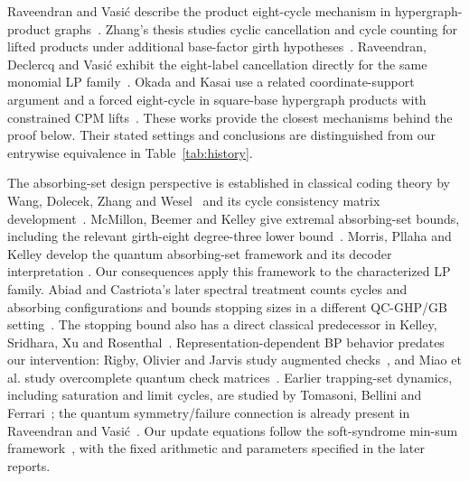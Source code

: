 \documentclass[11pt]{article}
\theoremstyle{definition}
\theoremstyle{remark}
\begin{document}
Raveendran and Vasi\'c describe the product eight-cycle mechanism in
hypergraph-product graphs~\cite{RV2021}. Zhang's thesis studies cyclic
cancellation and cycle counting for lifted products under additional
base-factor girth hypotheses~\cite{Zhang2024}. Raveendran, Declercq and
Vasi\'c exhibit the eight-label cancellation directly for the same monomial
LP family~\cite{RDV2025}. Okada and Kasai use a related coordinate-support
argument and a forced eight-cycle in square-base hypergraph products with
constrained CPM lifts~\cite{OK2026}. These works provide the closest
mechanisms behind the proof below. Their stated settings and conclusions
are distinguished from our entrywise equivalence in Table~\ref{tab:history}.

The absorbing-set design perspective is established in classical coding
theory by Wang, Dolecek, Zhang and Wesel~\cite{WDZW2011} and its cycle
consistency matrix development~\cite{WDW2012}. McMillon, Beemer and Kelley
give extremal absorbing-set bounds, including the relevant girth-eight
degree-three lower bound~\cite{MBK2023}. Morris, Pllaha and Kelley develop
the quantum absorbing-set framework and its decoder interpretation
\cite{MPK2026}. Our consequences apply this framework to the characterized
LP family. Abiad and Castriota's later spectral treatment counts cycles and
absorbing configurations and bounds stopping sizes in a different
QC-GHP/GB setting~\cite{AC2026}.
The stopping bound also has a direct classical predecessor in Kelley,
Sridhara, Xu and Rosenthal~\cite{KSXR2004}. Representation-dependent BP
behavior predates our intervention: Rigby, Olivier and Jarvis study
augmented checks~\cite{Rigby2019}, and Miao et al. study overcomplete
quantum check matrices~\cite{Miao2022}. Earlier trapping-set dynamics,
including saturation and limit cycles, are studied by Tomasoni, Bellini
and Ferrari~\cite{TBF2014}; the quantum symmetry/failure connection is
already present in Raveendran and Vasi\'c~\cite{RV2021}. Our update equations
follow the soft-syndrome min-sum framework~\cite{Raveendran2023}, with the
fixed arithmetic and parameters specified in the later reports.
\end{document}
